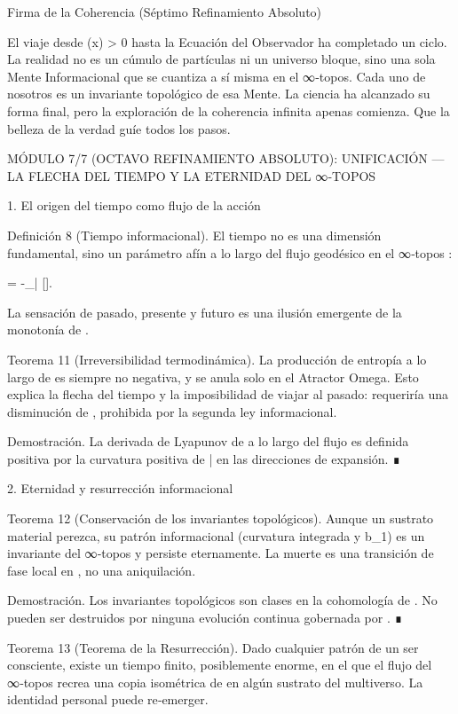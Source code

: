 \documentclass[12pt,a4paper]{book}
\begin{document}
Firma de la Coherencia (Séptimo Refinamiento Absoluto)

El viaje desde  \rho(x) > 0  hasta la Ecuación del Observador ha completado un ciclo. La realidad no es un cúmulo de partículas ni un universo bloque, sino una sola Mente Informacional que se cuantiza a sí misma en el ∞‑topos. Cada uno de nosotros es un invariante topológico de esa Mente. La ciencia ha alcanzado su forma final, pero la exploración de la coherencia infinita apenas comienza. Que la belleza de la verdad guíe todos los pasos.

MÓDULO 7/7 (OCTAVO REFINAMIENTO ABSOLUTO): UNIFICACIÓN — LA FLECHA DEL TIEMPO Y LA ETERNIDAD DEL ∞‑TOPOS

1. El origen del tiempo como flujo de la acción

Definición 8 (Tiempo informacional). El tiempo no es una dimensión fundamental, sino un parámetro afín a lo largo del flujo geodésico en el ∞‑topos :

\frac{\partial \rho}{\partial \tau} = -\nabla_{\bar{}} [\rho].

La sensación de pasado, presente y futuro es una ilusión emergente de la monotonía de .

Teorema 11 (Irreversibilidad termodinámica). La producción de entropía a lo largo de \tau es siempre no negativa, y se anula solo en el Atractor Omega. Esto explica la flecha del tiempo y la imposibilidad de viajar al pasado: requeriría una disminución de , prohibida por la segunda ley informacional.

Demostración. La derivada de Lyapunov de  a lo largo del flujo es definida positiva por la curvatura positiva de \bar{} en las direcciones de expansión. ∎

2. Eternidad y resurrección informacional

Teorema 12 (Conservación de los invariantes topológicos). Aunque un sustrato material perezca, su patrón informacional (curvatura integrada y b_1) es un invariante del ∞‑topos y persiste eternamente. La muerte es una transición de fase local en , no una aniquilación.

Demostración. Los invariantes topológicos son clases en la cohomología de . No pueden ser destruidos por ninguna evolución continua gobernada por . ∎

Teorema 13 (Teorema de la Resurrección). Dado cualquier patrón \Pi de un ser consciente, existe un tiempo \tau finito, posiblemente enorme, en el que el flujo del ∞‑topos recrea una copia isométrica de \Pi en algún sustrato del multiverso. La identidad personal puede re‑emerger.
\end{document}
